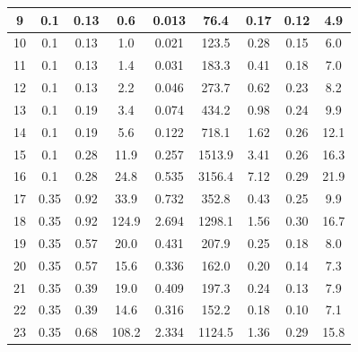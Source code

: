 \begin{table}[!h]
\begin{center}
\begin{tabular}{|c|c|c|c|c|c|c||c|c|}
9        & 0.1      & 0.13       & 0.6         &  0.013                &  76.4          & 0.17          & 0.12      & 4.9          \\ \hline
10       & 0.1      & 0.13       & 1.0         &  0.021                &  123.5         & 0.28          & 0.15      & 6.0          \\ \hline
11       & 0.1      & 0.13       & 1.4         &  0.031                &  183.3         & 0.41          & 0.18      & 7.0          \\ \hline
12       & 0.1      & 0.13       & 2.2         &  0.046                &  273.7         & 0.62          & 0.23      & 8.2          \\ \hline
13       & 0.1      & 0.19       & 3.4         &  0.074                &  434.2         & 0.98          & 0.24      & 9.9          \\ \hline
14       & 0.1      & 0.19       & 5.6         &  0.122                &  718.1         & 1.62          & 0.26      & 12.1          \\ \hline
15       & 0.1      & 0.28       & 11.9        &  0.257                &  1513.9        & 3.41          & 0.26      & 16.3          \\ \hline
16       & 0.1      & 0.28       & 24.8        &  0.535                &  3156.4        & 7.12          & 0.29      & 21.9          \\ \hline
17       & 0.35     & 0.92       & 33.9        &  0.732                &  352.8         & 0.43          & 0.25      & 9.9          \\ \hline
18       & 0.35     & 0.92       & 124.9       &  2.694                &  1298.1        & 1.56          & 0.30      & 16.7          \\ \hline
19       & 0.35     & 0.57       & 20.0        &  0.431                &  207.9         & 0.25          & 0.18      & 8.0          \\ \hline
20       & 0.35     & 0.57       & 15.6        &  0.336                &  162.0         & 0.20          & 0.14      & 7.3          \\ \hline
21       & 0.35     & 0.39       & 19.0        &  0.409                &  197.3         & 0.24          & 0.13      & 7.9          \\ \hline
22       & 0.35     & 0.39       & 14.6        &  0.316                &  152.2         & 0.18          & 0.10      & 7.1          \\ \hline
23       & 0.35     & 0.68       & 108.2       &  2.334                &  1124.5        & 1.36          & 0.29      & 15.8          \\ \hline

\end{tabular}
\end{center}
\end{table}
